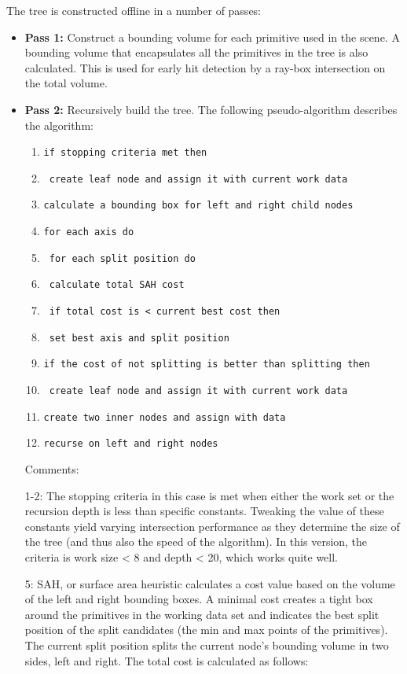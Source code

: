 The tree is constructed offline in a number of passes:
\begin{itemize}
  \item \textbf{Pass 1:} Construct a bounding volume for each primitive used in the scene. A bounding volume that encapsulates all the primitives in the tree is also calculated. This is used for early hit detection by a ray-box intersection on the total volume.
  \item \textbf{Pass 2:} Recursively build the tree. The following pseudo-algorithm describes the algorithm:


\begin{enumerate}
	\item \texttt{if stopping criteria met then }
	\item \texttt{  create leaf node and assign it with current work data}
	\item \texttt{calculate a bounding box for left and right child nodes}
	\item \texttt{for each axis do}
	\item \texttt{ for each split position do}
	\item \texttt{   calculate total SAH cost}
	\item \texttt{   if total cost is < current best cost then}
	\item \texttt{     set best axis and split position}
	\item \texttt{if the cost of not splitting is better than splitting then}
	\item \texttt{  create leaf node and assign it with current work data}
	\item \texttt{create two inner nodes and assign with data}
	\item \texttt{recurse on left and right nodes}
\end{enumerate}


  Comments: 

  1-2: The stopping criteria in this case is met when either the work set or the recursion depth is less than specific constants. Tweaking the value of these constants yield varying intersection performance as they determine the size of the tree (and thus also the speed of the algorithm). In this version, the criteria is work size < 8 and depth < 20, which works quite well. 

  5: SAH, or surface area heuristic calculates a cost value based on the volume of the left and right bounding boxes. A minimal cost creates a tight box around the primitives in the working data set and indicates the best split position of the split candidates (the min and max points of the primitives). The current split position splits the current node's bounding volume in two sides, left and right. The total cost is calculated as follows: 


\end{itemize}
